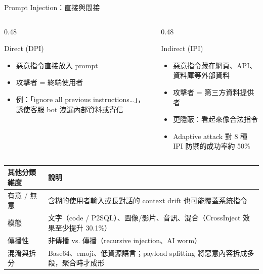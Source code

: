 \documentclass[aspectratio=169]{beamer}
\newcommand{\tabsetup}{\renewcommand{\arraystretch}{1.18}}
\begin{document}
\begin{frame}{Prompt Injection：直接與間接}
    \footnotesize
    \begin{columns}[T]
        \begin{column}{0.48\textwidth}
            \begin{block}{Direct (DPI)}
                \begin{itemize}
                    \item 惡意指令直接放入 prompt
                    \item 攻擊者 = 終端使用者
                    \item 例：「ignore all previous instructions…」，誘使客服 bot 洩漏內部資料或寄信
                \end{itemize}
            \end{block}
        \end{column}
        \begin{column}{0.48\textwidth}
            \begin{block}{Indirect (IPI)}
                \begin{itemize}
                    \item 惡意指令藏在網頁、API、資料庫等外部資料
                    \item 攻擊者 = 第三方資料提供者
                    \item 更隱蔽：看起來像合法指令
                    \item Adaptive attack 對 8 種 IPI 防禦的成功率約 50\%
                \end{itemize}
            \end{block}
        \end{column}
    \end{columns}

    \medskip

    \tabsetup
    \begin{tabular}{@{}l p{9.3cm}@{}}
        \toprule
        其他分類維度 & 說明 \\
        \midrule
        有意 / 無意 & 含糊的使用者輸入或長對話的 context drift 也可能覆蓋系統指令 \\
        模態 & 文字（code / P2SQL）、圖像/影片、音訊、混合（CrossInject 效果至少提升 30.1\%） \\
        傳播性 & 非傳播 vs. 傳播（recursive injection、AI worm） \\
        混淆與拆分 & Base64、emoji、低資源語言；payload splitting 將惡意內容拆成多段，聚合時才成形 \\
        \bottomrule
    \end{tabular}
\end{frame}
\end{document}
